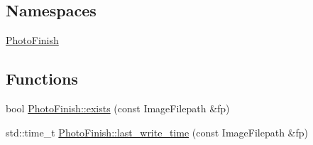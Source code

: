 \subsection*{Namespaces}
\begin{DoxyCompactItemize}
\item 
 \hyperlink{namespace_photo_finish}{Photo\+Finish}
\end{DoxyCompactItemize}
\subsection*{Functions}
\begin{DoxyCompactItemize}
\item 
bool \hyperlink{namespace_photo_finish_aabc75ddd4dcb561448e15c30b0efa906}{Photo\+Finish\+::exists} (const Image\+Filepath \&fp)
\item 
std\+::time\+\_\+t \hyperlink{namespace_photo_finish_a125acf6d378db915789ac48a723be3a3}{Photo\+Finish\+::last\+\_\+write\+\_\+time} (const Image\+Filepath \&fp)
\end{DoxyCompactItemize}
